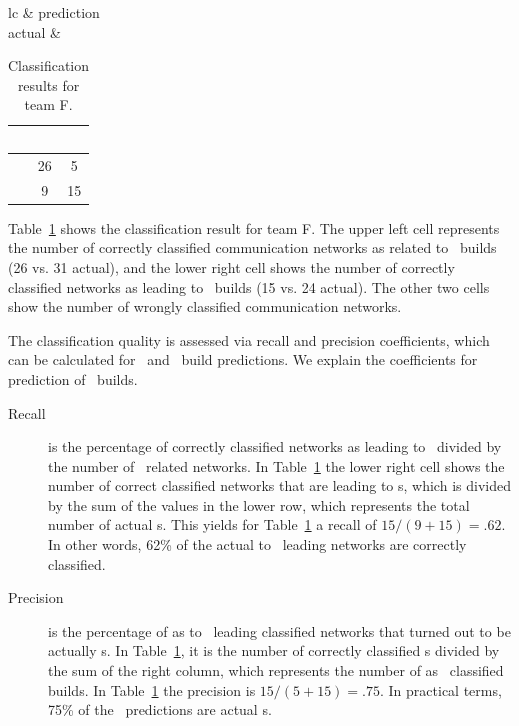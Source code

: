 \begin{table}[t] \centering\small
\begin{tabular}{lc}
& prediction \\
actual & 
\begin{tabular}{r|c|c|}
& \ok\ & \error\ \\\hline
\ok\ & 26 & 5 \\\hline
\error\ & 9 & 15 \\\hline
\end{tabular}
\end{tabular}
\caption{Classification results for team F.}
\label{tab:cont}
\end{table}

Table~\ref{tab:cont} shows the classification result for team F. The upper left
cell represents the number of correctly classified communication networks as
related to \ok\ builds (26 vs. 31 actual), and the lower right cell shows the
number of correctly classified networks as leading to \error\ builds (15 vs. 24
actual). The other two cells show the number of wrongly classified communication
networks.

The classification quality is assessed via recall and precision coefficients,
which can be calculated for \error\ and \ok\ build  predictions. We explain the
coefficients for prediction of \error\ builds.

\begin{description}
\item[Recall] is the percentage of correctly classified networks as leading to
\error\ divided by the number of \error\ related networks. In
Table~\ref{tab:cont} the lower right cell shows the number of correct classified
networks that are leading to \error s, which is divided by the sum of the values
in the lower row, which represents the total number of actual \error s. This
yields for Table~\ref{tab:cont} a recall of $15/(9+15)=.62$. In other words,
62\% of the actual to \error\ leading networks are correctly classified.
 
\item[Precision] is the percentage of as to \error\ leading classified networks
that turned out to be actually \error s. In Table~\ref{tab:cont}, it is the
number of correctly classified \error s divided by the sum of the right column,
which represents the number of as \error\ classified builds. In
Table~\ref{tab:cont} the precision is $15/(5+15)=.75$. In practical terms, 75\%
of the \error\ predictions are actual \error s.
\end{description}





